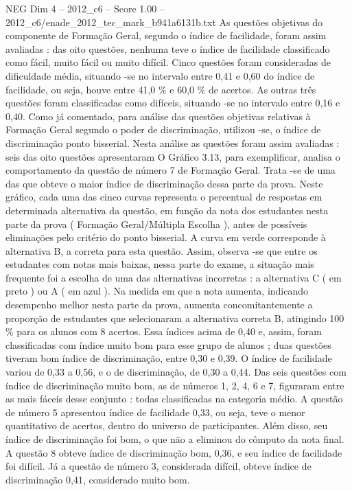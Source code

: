 \begin{textsample}{NEG Dim 4 – 2012\_c6 – Score 1.00 – 2012\_c6/enade\_2012\_tec\_mark\_b941a6131b.txt}
As questões objetivas do componente de Formação Geral, segundo o índice de facilidade, foram assim avaliadas : das oito questões, nenhuma teve o índice de facilidade classificado como fácil, muito fácil ou muito difícil.
Cinco questões foram consideradas de dificuldade média, situando -se no intervalo entre 0,41 e 0,60 do índice de facilidade, ou seja, houve entre 41,0 \% e 60,0 \% de acertos.
As outras três questões foram classificadas como difíceis, situando -se no intervalo entre 0,16 e 0,40.
Como já comentado, para análise das questões objetivas relativas à Formação Geral segundo o poder de discriminação, utilizou -se, o índice de discriminação ponto bisserial.
Nesta análise as questões foram assim avaliadas : seis das oito questões apresentaram O Gráfico 3.13, para exemplificar, analisa o comportamento da questão de número 7 de Formação Geral.
Trata -se de uma das que obteve o maior índice de discriminação dessa parte da prova.
Neste gráfico, cada uma das cinco curvas representa o percentual de respostas em determinada alternativa da questão, em função da nota dos estudantes nesta parte da prova ( Formação Geral/Múltipla Escolha ), antes de possíveis eliminações pelo critério do ponto bisserial.
A curva em verde corresponde à alternativa B, a correta para esta questão.
Assim, observa -se que entre os estudantes com notas mais baixas, nessa parte do exame, a situação mais frequente foi a escolha de uma das alternativas incorretas : a alternativa C ( em preto ) ou A ( em azul ).
Na medida em que a nota aumenta, indicando desempenho melhor nesta parte da prova, aumenta concomitantemente a proporção de estudantes que selecionaram a alternativa correta B, atingindo 100 \% para os alunos com 8 acertos.
Essa índices acima de 0,40 e, assim, foram classificadas com índice muito bom para esse grupo de alunos ; duas questões tiveram bom índice de discriminação, entre 0,30 e 0,39.
O índice de facilidade variou de 0,33 a 0,56, e o de discriminação, de 0,30 a 0,44.
Das seis questões com índice de discriminação muito bom, as de números 1, 2, 4, 6 e 7, figuraram entre as mais fáceis desse conjunto : todas classificadas na categoria médio.
A questão de número 5 apresentou índice de facilidade 0,33, ou seja, teve o menor quantitativo de acertos, dentro do universo de participantes.
Além disso, seu índice de discriminação foi bom, o que não a eliminou do cômputo da nota final.
A questão 8 obteve índice de discriminação bom, 0,36, e seu índice de facilidade foi difícil.
Já a questão de número 3, considerada difícil, obteve índice de discriminação 0,41, considerado muito bom.

\end{textsample}
